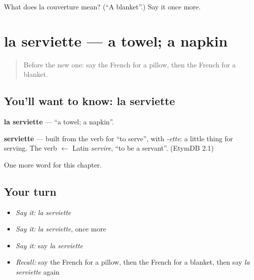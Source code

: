 \begin{tcolorbox}[breakable,colback=teal!4,colframe=teal!35!black,title={Before you move on}]
What does la couverture mean? (\textquotedblleft{}A blanket\textquotedblright{}.) Say it once more.
\end{tcolorbox}
\section[la serviette]{la serviette — a towel; a napkin}

\label{lesson:FR-C113-serviette}



\begin{quote}
Before the new one: say the French for a pillow, then the French for a blanket.
\end{quote}

\subsection*{You'll want to know: la serviette}
\textbf{la serviette} — \textquotedblleft{}a towel; a napkin\textquotedblright{}.

\begin{cousinweb}
\textbf{serviette} — built from the verb for \textquotedblleft{}to serve\textquotedblright{}, with \emph{-ette}: a little thing for serving. The verb $\leftarrow$ Latin \emph{servire}, \textquotedblleft{}to be a servant\textquotedblright{}. (EtymDB 2.1)
\end{cousinweb}

\begin{grammarlens}[title={What you've built}]
One more word for this chapter.
\end{grammarlens}

\subsection*{Your turn}
\begin{itemize}
\raggedright
  \item \emph{Say it:} \emph{la serviette}
  \item \emph{Say it:} \emph{la serviette}, once more
  \item \emph{Say it:} say \emph{la serviette}
  \item \emph{Recall:} say the French for a pillow, then the French for a blanket, then say \emph{la serviette} again
\end{itemize}

